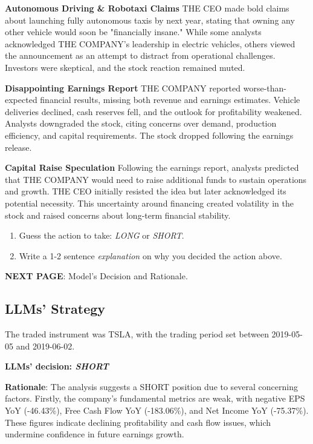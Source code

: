 \documentclass[8pt]{scrartcl}
\begin{document}
\textbf{Autonomous Driving \& Robotaxi Claims}
THE CEO made bold claims about launching fully autonomous taxis by next year, stating that owning any other vehicle would soon be "financially insane." While some analysts acknowledged THE COMPANY's leadership in electric vehicles, others viewed the announcement as an attempt to distract from operational challenges. Investors were skeptical, and the stock reaction remained muted.

\textbf{Disappointing Earnings Report}
THE COMPANY reported worse-than-expected financial results, missing both revenue and earnings estimates. Vehicle deliveries declined, cash reserves fell, and the outlook for profitability weakened. Analysts downgraded the stock, citing concerns over demand, production efficiency, and capital requirements. The stock dropped following the earnings release.

\textbf{Capital Raise Speculation}
Following the earnings report, analysts predicted that THE COMPANY would need to raise additional funds to sustain operations and growth. THE CEO initially resisted the idea but later acknowledged its potential necessity. This uncertainty around financing created volatility in the stock and raised concerns about long-term financial stability.


\begin{tcolorbox}[colback=blue!10, colframe=blue!60, title=\textbf{TASKS}, sharp corners=southwest]
\begin{enumerate}
    \item Guess the action to take: \textit{LONG} or \textit{SHORT}.
    \item Write a 1-2 sentence \textit{explanation} on why you decided the action above.
\end{enumerate}
\end{tcolorbox}

\textbf{NEXT PAGE}: Model's Decision and Rationale.

\newpage

\subsection*{LLMs' Strategy} \label{strategy1}

The traded instrument was TSLA, with the trading period set between 2019-05-05 and 2019-06-02.

\textbf{LLMs' decision: \textit{SHORT}}

\textbf{Rationale}: The analysis suggests a SHORT position due to several concerning factors. Firstly, the company's fundamental metrics are weak, with negative EPS YoY (-46.43\%), Free Cash Flow YoY (-183.06\%), and Net Income YoY (-75.37\%). These figures indicate declining profitability and cash flow issues, which undermine confidence in future earnings growth.
\end{document}
